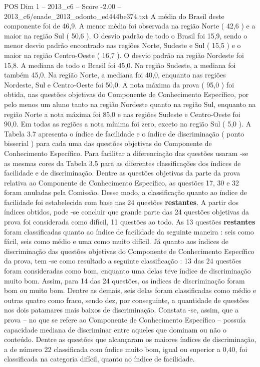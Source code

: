 \begin{textsample}{POS Dim 1 – 2013\_c6 – Score -2.00 – 2013\_c6/enade\_2013\_odonto\_ed444be374.txt}
A média do Brasil deste componente foi de 46,9.
A menor média foi observada na região Norte ( 42,6 ) e a maior na região Sul ( 50,6 ).
O desvio padrão de todo o Brasil foi 15,9, sendo o menor desvio padrão encontrado nas regiões Norte, Sudeste e Sul ( 15,5 ) e o maior na região Centro-Oeste ( 16,7 ).
O desvio padrão na região Nordeste foi 15,8.
A mediana de todo o Brasil foi 45,0.
Na região Sudeste, a mediana foi também 45,0.
Na região Norte, a mediana foi 40,0, enquanto nas regiões Nordeste, Sul e Centro-Oeste foi 50,0.
A nota máxima da prova ( 95,0 ) foi obtida, nas questões objetivas do Componente de Conhecimento Específico, por pelo menos um aluno tanto na região Nordeste quanto na região Sul, enquanto na região Norte a nota máxima foi 85,0 e nas regiões Sudeste e Centro-Oeste foi 90,0.
Em todas as regiões a nota mínima foi zero, exceto na região Sul ( 5,0 ).
A Tabela 3.7 apresenta o índice de facilidade e o índice de discriminação ( ponto bisserial ) para cada uma das questões objetivas do Componente de Conhecimento Específico.
Para facilitar a diferenciação das questões usaram -se as mesmas cores da Tabela 3.5 para as diferentes classificações dos índices de facilidade e de discriminação.
Dentre as questões objetivas da parte da prova relativa ao Componente de Conhecimento Específico, as questões 17, 30 e 32 foram anuladas pela Comissão.
Desse modo, a classificação quanto ao índice de facilidade foi estabelecida com base nas 24 questões \textbf{restantes}.
A partir dos índices obtidos, pode -se concluir que grande parte das 24 questões objetivas da prova foi considerada como difícil, 11 questões ao todo.
As 13 questões \textbf{restantes} foram classificadas quanto ao índice de facilidade da seguinte maneira : seis como fácil, seis como médio e uma como muito difícil.
Já quanto aos índices de discriminação das questões objetivas do Componente de Conhecimento Específico da prova, tem -se como resultado a seguinte classificação : 13 das 24 questões foram consideradas como bom, enquanto uma delas teve índice de discriminação muito bom.
Assim, para 14 das 24 questões, os índices de discriminação foram bom ou muito bom.
Dentre as demais, seis delas foram classificadas como médio e outras quatro como fraco, sendo dez, por conseguinte, a quantidade de questões nos dois patamares mais baixos de discriminação.
Constata -se, assim, que a prova – no que se refere ao Componente de Conhecimento Específico – possuía capacidade mediana de discriminar entre aqueles que dominam ou não o conteúdo.
Dentre as questões que alcançaram os maiores índices de discriminação, a de número 22 classificada com índice muito bom, igual ou superior a 0,40, foi classificada na categoria difícil, quanto ao índice de facilidade.

\end{textsample}
